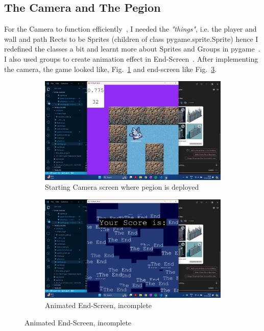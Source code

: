 \documentclass{article}
\begin{document}
\subsection{The Camera and The Pegion}
For the Camera to function efficiently~\cite{camera_tutorial}, I needed the \textit{"things"}, i.e. the player and wall and path Rects to be Sprites (children of class pygame.sprite.Sprite) hence I redefined the classes a bit and learnt more about Sprites and Groups in pygame~\cite{sprite_reference}. I also used groups to create animation effect in End-Screen~\cite*{end-scren_animation}. After implementing the camera, the game looked like, Fig.~\ref{fig:camera1} and end-screen like Fig.~\ref{fig:camera2}.

\begin{figure}[h]
    \caption[1]{}
    \begin{subfigure}[b]{0.5\textwidth}
        \centering
        \includegraphics[width=\textwidth]{screenshots/Screenshot (174).png}
        \caption[(a)]{Starting Camera screen where pegion is deployed}
        \label{fig:camera1}
    \end{subfigure}
    \begin{subfigure}[b]{0.5\textwidth}
        \centering
        \includegraphics[width=\textwidth]{screenshots/Screenshot (175).png}
        \caption[(a)]{Animated End-Screen, incomplete}
        \label{fig:camera2}
    \end{subfigure}
\end{figure}    
\end{document}
